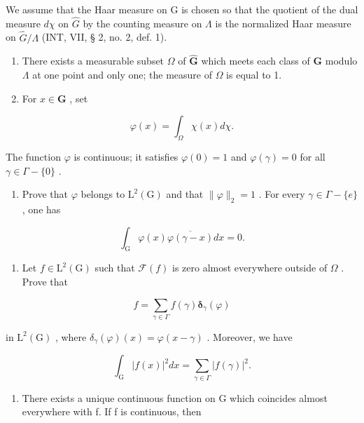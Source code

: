 We assume that the Haar measure on G is chosen so that the quotient of the dual measure \(d\chi\) on \(\widehat{G}\) by the counting measure on \(\Lambda\) is the normalized Haar measure on \(\widehat{G}/\Lambda\) (INT, VII, § 2, no. 2, def. 1).

\begin{enumerate}
\def\labelenumi{\alph{enumi})}
\item
  There exists a measurable subset \(\Omega\) of \(\widehat{\mathbf{G}}\) which meets each class of \(\mathbf{G}\) modulo \(\Lambda\) at one point and only one; the measure of \(\Omega\) is equal to 1.
\item
  For \(x\in \mathbf{G}\) , set
\end{enumerate}

\[
\varphi (x) = \int_ {\Omega} \chi (x) d \chi .
\]

The function \(\varphi\) is continuous; it satisfies \(\varphi(0) = 1\) and \(\varphi(\gamma) = 0\) for all \(\gamma \in \Gamma - \{0\}\) .

\begin{enumerate}
\def\labelenumi{\alph{enumi})}
\setcounter{enumi}{2}
\tightlist
\item
  Prove that \(\varphi\) belongs to \(\mathrm{L}^2 (\mathrm{G})\) and that \(\| \varphi \| _2 = 1\) . For every \(\gamma \in \Gamma -\{e\}\) , one has
\end{enumerate}

\[
\int_ {\mathrm{G}} \varphi (x) \overline {{\varphi (\gamma - x)}} d x = 0.
\]

\begin{enumerate}
\def\labelenumi{\alph{enumi})}
\setcounter{enumi}{3}
\tightlist
\item
  Let \(f \in \mathrm{L}^{2}(\mathrm{G})\) such that \(\mathcal{F}(f)\) is zero almost everywhere outside of \(\Omega\) . Prove that
\end{enumerate}

\[
f = \sum_ {\gamma \in \Gamma} f (\gamma) \boldsymbol {\delta} _ {\gamma} (\varphi)
\]

in \(\mathrm{L}^2 (\mathrm{G})\) , where \(\delta_{\gamma}(\varphi)(x) = \varphi (x - \gamma)\) . Moreover, we have

\[
\int_ {\mathrm{G}} | f (x) | ^ {2} d x = \sum_ {\gamma \in \Gamma} | f (\gamma) | ^ {2}.
\]

\begin{enumerate}
\def\labelenumi{\alph{enumi})}
\setcounter{enumi}{4}
\tightlist
\item
  There exists a unique continuous function on G which coincides almost everywhere with f. If f is continuous, then
\end{enumerate}

